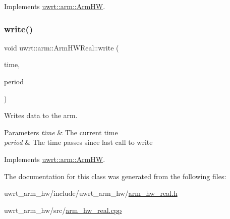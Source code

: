 Implements \hyperlink{classuwrt_1_1arm_1_1_arm_h_w_af2164103badfa99373f787b8a3cecb6b}{uwrt\+::arm\+::\+Arm\+HW}.

\mbox{\label{classuwrt_1_1arm_1_1_arm_h_w_real_a25ab702964a8b1db7ea58b040189b820}} 
\subsubsection{\texorpdfstring{write()}{write()}}
{\footnotesize\ttfamily void uwrt\+::arm\+::\+Arm\+H\+W\+Real\+::write (\begin{DoxyParamCaption}\item[{const ros\+::\+Time \&}]{time,  }\item[{const ros\+::\+Duration \&}]{period }\end{DoxyParamCaption})\hspace{0.3cm}{\ttfamily [virtual]}}



Writes data to the arm. 


\begin{DoxyParams}{Parameters}
{\em time} & The current time \\
\hline
{\em period} & The time passes since last call to write \\
\hline
\end{DoxyParams}


Implements \hyperlink{classuwrt_1_1arm_1_1_arm_h_w_a934119487836109e24d9054f10e9832f}{uwrt\+::arm\+::\+Arm\+HW}.



The documentation for this class was generated from the following files\+:\begin{DoxyCompactItemize}
\item 
uwrt\+\_\+arm\+\_\+hw/include/uwrt\+\_\+arm\+\_\+hw/\hyperlink{arm__hw__real_8h}{arm\+\_\+hw\+\_\+real.\+h}\item 
uwrt\+\_\+arm\+\_\+hw/src/\hyperlink{arm__hw__real_8cpp}{arm\+\_\+hw\+\_\+real.\+cpp}\end{DoxyCompactItemize}
